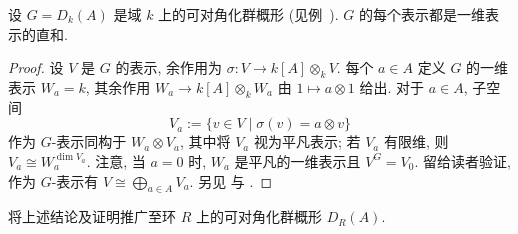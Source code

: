 \newpage
\begin{proposition}\label{src:B.1.16}
设 $G=D_k(A)$ 是域 $k$ 上的可对角化群概形 (见例~). $G$ 的每个表示都是一维表示的直和.
\end{proposition}
\begin{proof}
设 $V$ 是 $G$ 的表示, 余作用为 $\sigma:V\to k[A]\otimes_k V$. 每个 $a\in A$ 定义 $G$ 的一维表示 $W_a=k$, 其余作用 $W_a\to k[A]\otimes_k W_a$ 由 $1\mapsto a\otimes1$ 给出. 对于 $a\in A$, 子空间
\[
V_a:=\{v\in V\mid\sigma(v)=a\otimes v\}
\]
作为 $G$-表示同构于 $W_a\otimes V_a$, 其中将 $V_a$ 视为平凡表示; 若 $V_a$ 有限维, 则 $V_a\cong W_a^{\dim V_a}$. 注意, 当 $a=0$ 时, $W_a$ 是平凡的一维表示且 $V^G=V_0$. 留给读者验证, 作为 $G$-表示有 $V\cong\bigoplus_{a\in A}V_a$. 另见 \cite[定理 $12.30$]{Mil17} 与 \cite[定理 $5.3.3$]{SGA3I}.
\end{proof}
\begin{exercise}\label{src:B.1.17}
将上述结论及证明推广至环 $R$ 上的可对角化群概形 $D_R(A)$.
\end{exercise}

